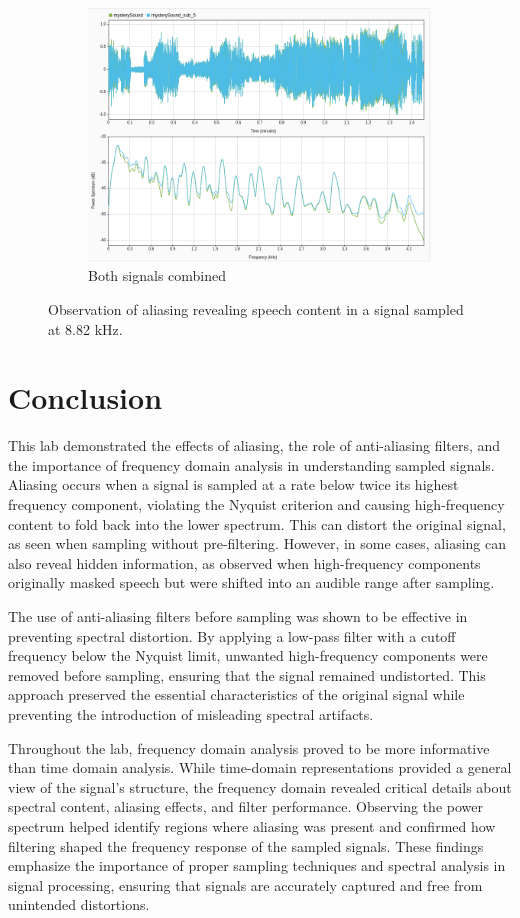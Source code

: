 \documentclass[12pt]{article}
\begin{document}
\begin{figure}[htbp]
\begin{subfigure}[b]{0.48\textwidth}
    \includegraphics[width=\linewidth]{labs/lab1/lab-report-tex/figures/SigAnalyzer/PartD/both.png}
    \caption{Both signals combined}
    \label{fig:f2}
  \end{subfigure}
  \caption{Observation of aliasing revealing speech content in a signal sampled at 8.82 kHz.}
\end{figure}
\FloatBarrier
\section{Conclusion}
This lab demonstrated the effects of aliasing, the role of anti-aliasing filters, and the importance of frequency domain analysis in understanding sampled signals. Aliasing occurs when a signal is sampled at a rate below twice its highest frequency component, violating the Nyquist criterion and causing high-frequency content to fold back into the lower spectrum. This can distort the original signal, as seen when sampling without pre-filtering. However, in some cases, aliasing can also reveal hidden information, as observed when high-frequency components originally masked speech but were shifted into an audible range after sampling.

The use of anti-aliasing filters before sampling was shown to be effective in preventing spectral distortion. By applying a low-pass filter with a cutoff frequency below the Nyquist limit, unwanted high-frequency components were removed before sampling, ensuring that the signal remained undistorted. This approach preserved the essential characteristics of the original signal while preventing the introduction of misleading spectral artifacts.

Throughout the lab, frequency domain analysis proved to be more informative than time domain analysis. While time-domain representations provided a general view of the signal’s structure, the frequency domain revealed critical details about spectral content, aliasing effects, and filter performance. Observing the power spectrum helped identify regions where aliasing was present and confirmed how filtering shaped the frequency response of the sampled signals. These findings emphasize the importance of proper sampling techniques and spectral analysis in signal processing, ensuring that signals are accurately captured and free from unintended distortions.
\end{document}
